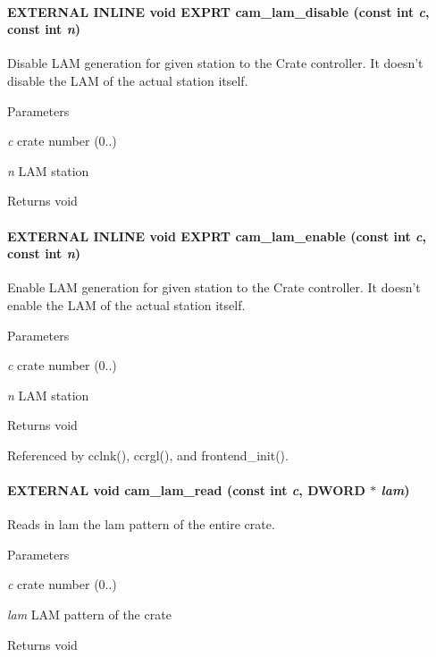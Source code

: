 \paragraph[{cam\_\-lam\_\-disable}]{\setlength{\rightskip}{0pt plus 5cm}EXTERNAL INLINE void EXPRT cam\_\-lam\_\-disable (const int {\em c}, \/  const int {\em n})}\hfill\label{group__mcstdfunctionh_gac24088d63d7b5b460a93eba5fbd32518}
Disable LAM generation for given station to the Crate controller. It doesn't disable the LAM of the actual station itself. 
\begin{DoxyParams}{Parameters}
\item[{\em c}]crate number (0..) \item[{\em n}]LAM station \end{DoxyParams}
\begin{DoxyReturn}{Returns}
void 
\end{DoxyReturn}
\paragraph[{cam\_\-lam\_\-enable}]{\setlength{\rightskip}{0pt plus 5cm}EXTERNAL INLINE void EXPRT cam\_\-lam\_\-enable (const int {\em c}, \/  const int {\em n})}\hfill\label{group__mcstdfunctionh_ga3b676540b901e12fc4fd6a8495d612eb}
Enable LAM generation for given station to the Crate controller. It doesn't enable the LAM of the actual station itself. 
\begin{DoxyParams}{Parameters}
\item[{\em c}]crate number (0..) \item[{\em n}]LAM station \end{DoxyParams}
\begin{DoxyReturn}{Returns}
void 
\end{DoxyReturn}


Referenced by cclnk(), ccrgl(), and frontend\_\-init().
\paragraph[{cam\_\-lam\_\-read}]{\setlength{\rightskip}{0pt plus 5cm}EXTERNAL void cam\_\-lam\_\-read (const int {\em c}, \/  {\bf DWORD} $\ast$ {\em lam})}\hfill\label{group__mcstdfunctionh_ga4b6c60f375489ea1dacc20ba3f2a4bd8}
Reads in lam the lam pattern of the entire crate. 
\begin{DoxyParams}{Parameters}
\item[{\em c}]crate number (0..) \item[{\em lam}]LAM pattern of the crate \end{DoxyParams}
\begin{DoxyReturn}{Returns}
void 
\end{DoxyReturn}



